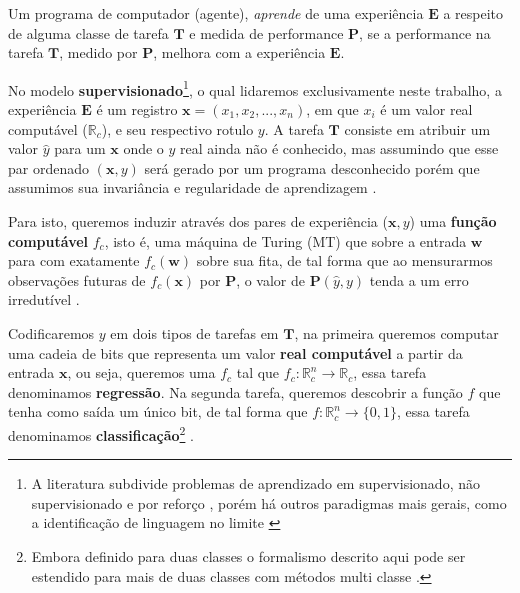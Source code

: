\begin{definition}
Um programa de computador (agente), \textit{aprende} de uma experiência
$\boldsymbol E$ a respeito de alguma classe de tarefa $\boldsymbol T$ e medida
de performance $\boldsymbol P$, se a performance na tarefa $\boldsymbol T$,
medido por $\boldsymbol P$, melhora com a experiência $\boldsymbol E$.
\end{definition}

No modelo \textbf{supervisionado}\footnote{A literatura subdivide problemas de
aprendizado em supervisionado, não supervisionado e por reforço
\cite{russell2016artificial,friedman2001elements,goodfellow2016deep},
porém há outros paradigmas mais gerais, como a identificação de linguagem no
limite \cite{gold1967language}}, o qual lidaremos exclusivamente neste
trabalho, a experiência $\boldsymbol E$ é um registro
$\boldsymbol{x}=(x_1,x_2,...,x_n)$, em que $x_i$ é um valor real computável
($\mathbb{R}_c$), e seu respectivo rotulo $y$. A tarefa $\boldsymbol T$
consiste em atribuir um valor $\hat{y}$ para um $\boldsymbol{x}$ onde o $y$
real ainda não é conhecido, mas assumindo que esse par ordenado
$(\boldsymbol{x},y)$ será gerado por um programa desconhecido porém que
assumimos sua invariância e regularidade de aprendizagem
\cite{mohri2018foundations,valiant1984theory}.

Para isto, queremos induzir através dos pares de experiência
($\boldsymbol{x},y$) uma \textbf{função computável} $f_c$, isto é, uma máquina
de Turing (MT) que sobre a entrada $\boldsymbol{w}$ para com exatamente
$f_c(\boldsymbol{w})$ sobre sua fita, de tal forma que ao mensurarmos
observações futuras de $f_c(\boldsymbol{x})$ por $\boldsymbol P$, o valor de
$\boldsymbol{P}(\hat{y},y)$ tenda a um erro irredutível
\cite{mohri2018foundations,mitchell1997machine,friedman2001elements}.

Codificaremos $y$ em dois tipos de tarefas em $\boldsymbol{T}$, na primeira
queremos computar uma cadeia de bits que representa um valor \textbf{real
computável} a partir da entrada $\boldsymbol{x}$, ou seja, queremos uma $f_c$
tal que $f_c:\mathbb{R}_c^n\longrightarrow \mathbb{R}_c$, essa tarefa
denominamos \textbf{regressão}. Na segunda tarefa, queremos descobrir a função
$f$ que tenha como saída um único bit, de tal forma que
$f:\mathbb{R}_c^n\longrightarrow \{0,1\}$, essa tarefa denominamos
\textbf{classificação}\footnote{Embora definido para duas classes o formalismo
descrito aqui pode ser estendido para mais de duas classes com métodos
multi classe \cite{abu2012learning}.} \cite{goodfellow2016deep,
mohri2018foundations}.

